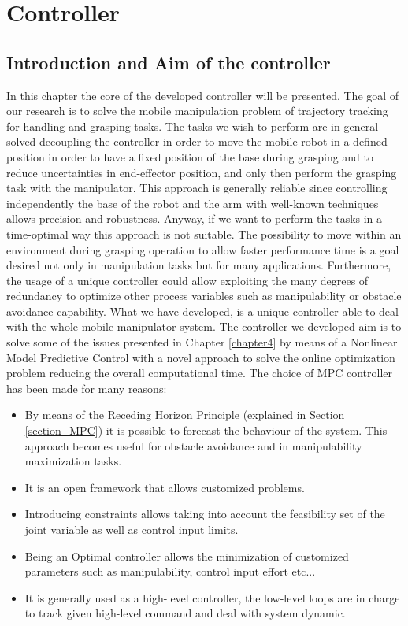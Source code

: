 
\chapter{Controller}
\label{chapter5}

\section{Introduction and Aim of the controller}

In this chapter the core of the developed controller will be presented. The goal of our research is to solve the mobile manipulation problem of trajectory tracking for handling and grasping tasks. The tasks we wish to perform are in general solved decoupling the controller in order to move the mobile robot in a defined position in order to have a fixed position of the base during grasping and to reduce uncertainties in end-effector position, and only then perform the grasping task with the manipulator. This approach is generally reliable since controlling independently the base of the robot and the arm with well-known techniques allows precision and robustness. Anyway, if we want to perform the tasks in a time-optimal way this approach is not suitable. The possibility to move within an environment during grasping operation to allow faster performance time is a goal desired not only in manipulation tasks but for many applications. Furthermore, the usage of a unique controller could allow exploiting the many degrees of redundancy to optimize other process variables such as manipulability or obstacle avoidance capability. What we have developed, is a unique controller able to deal with the whole mobile manipulator system. The controller we developed aim is to solve some of the issues presented in Chapter \ref{chapter4} by means of a Nonlinear Model Predictive Control with a novel approach to solve the online optimization problem reducing the overall computational time. The choice of MPC controller has been made for many reasons: 

\begin{itemize}
\item By means of the Receding Horizon Principle (explained in Section \ref{section_MPC}) it is possible to forecast the behaviour of the system. This approach becomes useful for obstacle avoidance and in manipulability maximization tasks.
\item It is an open framework that allows customized problems.
\item Introducing constraints allows taking into account the feasibility set of the joint variable as well as control input limits.
\item Being an Optimal controller allows the minimization of customized parameters such as manipulability, control input effort etc...
\item It is generally used as a high-level controller, the low-level loops are in charge to track given high-level command and deal with system dynamic.
\end{itemize}

